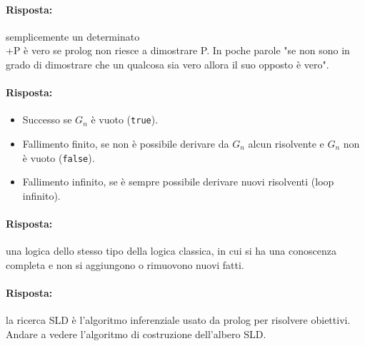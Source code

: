 
\paragraph{Risposta:} semplicemente un determinato \\+P è vero se prolog non riesce a dimostrare P. In poche parole "se non sono in grado di dimostrare che un qualcosa sia vero allora il suo opposto è vero".




\paragraph{Risposta:}

\begin{itemize}
  \item Successo se $G_n$ è vuoto (\texttt{true}). 
  \item Fallimento finito, se non è possibile derivare da $G_n$ alcun risolvente e $G_n$ non è vuoto (\texttt{false}).
  \item Fallimento infinito, se è sempre possibile derivare nuovi risolventi (loop infinito).
\end{itemize}


\paragraph{Risposta:} una logica dello stesso tipo della logica classica, in cui si ha una conoscenza completa e non si aggiungono o rimuovono nuovi fatti.


\paragraph{Risposta:} la ricerca SLD è l'algoritmo inferenziale usato da prolog per risolvere obiettivi. Andare a vedere l'algoritmo di costruzione dell'albero SLD.



